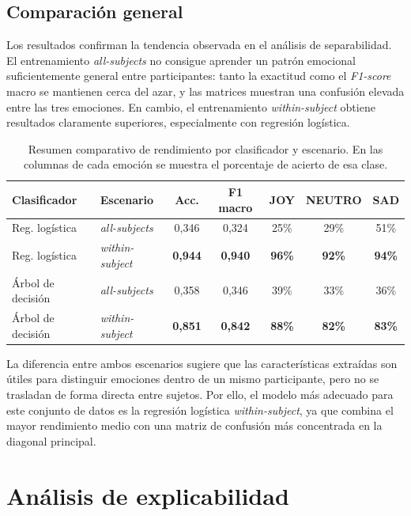 \subsection{Comparación general}

Los resultados confirman la tendencia observada en el análisis de separabilidad. El entrenamiento \textit{all-subjects} no consigue aprender un patrón emocional suficientemente general entre participantes: tanto la exactitud como el \textit{F1-score} macro se mantienen cerca del azar, y las matrices muestran una confusión elevada entre las tres emociones. En cambio, el entrenamiento \textit{within-subject} obtiene resultados claramente superiores, especialmente con regresión logística.

\begin{table}[H]
\centering
\begingroup
\setlength{\tabcolsep}{4.5pt}
\renewcommand{\arraystretch}{1.18}
\begin{tabular}{llccccc}
\hline
\textbf{Clasificador} & \textbf{Escenario} & \textbf{Acc.} & \textbf{F1 macro} & \textbf{JOY} & \textbf{NEUTRO} & \textbf{SAD} \\
\hline
Reg. logística & \textit{all-subjects} & 0,346 & 0,324 & 25\% & 29\% & 51\% \\
Reg. logística & \textit{within-subject} & \textbf{0,944} & \textbf{0,940} & \textbf{96\%} & \textbf{92\%} & \textbf{94\%} \\
Árbol de decisión & \textit{all-subjects} & 0,358 & 0,346 & 39\% & 33\% & 36\% \\
Árbol de decisión & \textit{within-subject} & \textbf{0,851} & \textbf{0,842} & \textbf{88\%} & \textbf{82\%} & \textbf{83\%} \\
\hline
\end{tabular}
\endgroup
\caption{Resumen comparativo de rendimiento por clasificador y escenario. En las columnas de cada emoción se muestra el porcentaje de acierto de esa clase.}
\label{tab:comparacion_entrenamiento}
\end{table}

La diferencia entre ambos escenarios sugiere que las características extraídas son útiles para distinguir emociones dentro de un mismo participante, pero no se trasladan de forma directa entre sujetos. Por ello, el modelo más adecuado para este conjunto de datos es la regresión logística \textit{within-subject}, ya que combina el mayor rendimiento medio con una matriz de confusión más concentrada en la diagonal principal.

\section{Análisis de explicabilidad}

